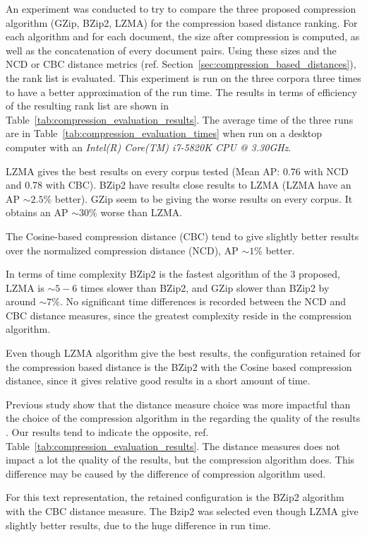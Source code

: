 An experiment was conducted to try to compare the three proposed compression algorithm (GZip, BZip2, LZMA) for the compression based distance ranking.
For each algorithm and for each document, the size after compression is computed, as well as the concatenation of every document pairs.
Using these sizes and the NCD or CBC distance metrics (ref. Section~\ref{sec:compression_based_distances}), the rank list is evaluated.
This experiment is run on the three corpora three times to have a better approximation of the run time.
The results in terms of efficiency of the resulting rank list are shown in Table~\ref{tab:compression_evaluation_results}.
The average time of the three runs are in Table~\ref{tab:compression_evaluation_times} when run on a desktop computer with an \textit{Intel(R) Core(TM) i7-5820K CPU @ 3.30GHz}.

LZMA gives the best results on every corpus tested (Mean AP: 0.76 with NCD and 0.78 with CBC).
BZip2 have results close results to LZMA (LZMA have an AP $\sim 2.5\%$ better).
GZip seem to be giving the worse results on every corpus.
It obtains an AP $\sim 30\%$ worse than LZMA.

The Cosine-based compression distance (CBC) tend to give slightly better results over the normalized compression distance (NCD), AP $\sim 1\%$ better.

In terms of time complexity BZip2 is the fastest algorithm of the 3 proposed, LZMA is $\sim 5-6$ times slower than BZip2, and GZip slower than BZip2 by around $\sim 7\%$.
No significant time differences is recorded between the NCD and CBC distance measures, since the greatest complexity reside in the compression algorithm.

Even though LZMA algorithm give the best results, the configuration retained for the compression based distance is the BZip2 with the Cosine based compression distance, since it gives relative good results in a short amount of time.

Previous study show that the distance measure choice was more impactful than the choice of the compression algorithm in the regarding the quality of the results \cite{comparing_compression}.
Our results tend to indicate the opposite, ref. Table~\ref{tab:compression_evaluation_results}.
The distance measures does not impact a lot the quality of the results, but the compression algorithm does.
This difference may be caused by the difference of compression algorithm used.

For this text representation, the retained configuration is the BZip2 algorithm with the CBC distance measure.
The Bzip2 was selected even though LZMA give slightly better results, due to the huge difference in run time.

